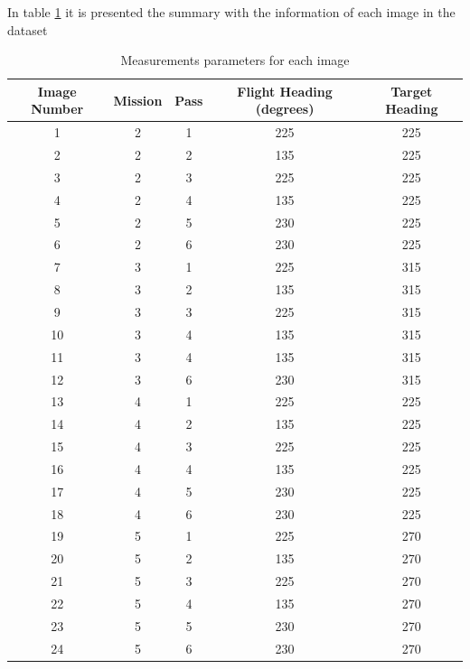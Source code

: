 In table \ref{tab:flight_mission} it is presented the summary with the information of each image in the dataset

\begin{table}[H]
    \centering
    \begin{tabular}{|c|c|c|c|c|}
        \hline 
        Image Number & Mission & Pass & Flight Heading (degrees) & Target Heading \\ \hline \hline
        1 & 2 & 1 & 225 & 225  \\ \hline
        2 & 2 & 2 & 135 & 225  \\ \hline
        3 & 2 & 3 & 225 & 225  \\ \hline
        4 & 2 & 4 & 135 & 225 \\ \hline
        5 & 2 & 5 & 230 & 225 \\ \hline
        6 & 2 & 6 & 230 & 225 \\ \hline
        7 & 3 & 1 & 225 & 315 \\ \hline
        8 & 3 & 2 & 135 & 315 \\ \hline
        9 & 3 & 3 & 225 & 315 \\ \hline
        10 & 3 & 4 & 135 & 315 \\ \hline
        11 & 3 & 4 & 135 & 315 \\ \hline
        12& 3 & 6 & 230 & 315  \\ \hline
        13 & 4 & 1 & 225 & 225  \\ \hline
        14 & 4 & 2 & 135 & 225  \\ \hline
        15 & 4 & 3 & 225 & 225  \\ \hline
        16 & 4 & 4 & 135 & 225  \\ \hline
        17 & 4 & 5 & 230 & 225  \\ \hline
        18 & 4 & 6 & 230& 225 \\ \hline
        19 & 5 & 1 & 225 & 270  \\ \hline
        20 & 5 & 2 & 135 & 270  \\ \hline
        21 & 5 & 3 & 225 & 270  \\ \hline
        22 & 5 & 4 & 135 & 270  \\ \hline
        23 & 5 & 5 & 230 & 270  \\ \hline
        24 & 5 & 6 & 230 & 270  \\ \hline
    \end{tabular}
    \caption{Measurements parameters for each image}
    \label{tab:flight_mission}
\end{table}



